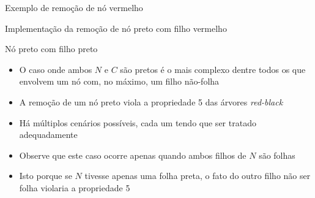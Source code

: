 \begin{frame}[fragile]{Exemplo de remoção de nó vermelho}


\end{frame}

\begin{frame}[fragile]{Implementação da remoção de nó preto com filho vermelho}
\end{frame}

\begin{frame}[fragile]{Nó preto com filho preto}

    \begin{itemize}
        \item O caso onde ambos $N$ e $C$ são pretos é o mais complexo dentre todos os que
            envolvem um nó com, no máximo, um filho não-folha

        \item A remoção de um nó preto viola a propriedade 5 das árvores \textit{red-black}

        \item Há múltiplos cenários possíveis, cada um tendo que ser tratado adequadamente

        \item Observe que este caso ocorre apenas quando ambos filhos de $N$ são folhas

        \item Isto porque se $N$ tivesse apenas uma folha preta, o fato do outro filho não ser
            folha violaria a propriedade 5
    \end{itemize}

\end{frame}

